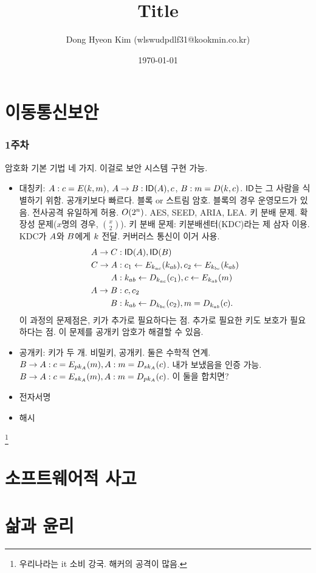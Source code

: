 \documentclass[10pt, a4paper]{report}
\title{Title}
\author{Dong Hyeon Kim (wlswudpdlf31@kookmin.co.kr)}
\date{\today}
\begin{document}
\tableofcontents

\chapter{이동통신보안}

\subsection*{1주차}

암호화 기본 기법 네 가지. 이걸로 보안 시스템 구현 가능.
\begin{itemize}
\item 대칭키: $A: c = E(k, m)$, $A \to B: \textsf{ID}(A), 
    c$, $B: m = D(k, c)$. $\textsf{ID}$는 그 사람을 식별하기 위함. 
    공개키보다 빠르다. 블록 or 스트림 암호.
    블록의 경우 운영모드가 있음. 전사공격 유일하게 허용. $O(2^{n})$. 
    AES, SEED, ARIA, LEA. 키 분배 문제. 확장성 문제($x$명의 경우, $\binom{x}{2}$).
    키 분배 문제: 키분배센터(KDC)라는 제 삼자 이용. KDC가 $A$와 $B$에게 $k$
    전달. 커버러스 통신이 이거 사용.
    \begin{equation}
      \begin{split}
        A \to C&: \textsf{ID}(A), \textsf{ID}(B) \\
        C \to A&: c_1 \leftarrow E_{k_{ac}}(k_{ab}), 
        c_2 \leftarrow E_{k_{bc}}(k_{ab}) \\
        A&: k_{ab} \leftarrow D_{k_{ac}}(c_1), 
        c \leftarrow E_{k_{ab}}(m) \\
        A \to B&: c, c_2 \\
        B&: k_{ab} \leftarrow D_{k_{bc}}(c_2), 
        m = D_{k_{ab}}(c).
      \end{split}
    \end{equation}
    이 과정의 문제점은, 키가 추가로 필요하다는 점. 추가로 필요한 키도 보호가 필요하다는 점.
    이 문제를 공개키 암호가 해결할 수 있음.
\item 공개키: 키가 두 개. 비밀키, 공개키. 둘은 수학적 연계.
    $B \to A: c = E_{pk_{A}}(m), 
    A: m = D_{sk_{A}}(c)$.
    내가 보냈음을 인증 가능.  
    $B \to A: c = E_{sk_{A}}(m), 
    A: m = D_{pk_{A}}(c)$.
    이 둘을 합치면? 
\item 전자서명
\item 해시
\end{itemize}


\footnote{우리나라는 it 소비 강국. 해커의 공격이 많음.}

\chapter{소프트웨어적 사고}



\chapter{삶과 윤리}
\end{document}
